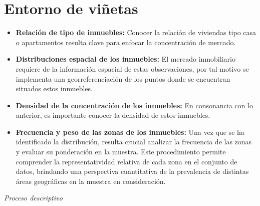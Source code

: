 \documentclass[12pt]{article}
\begin{document}
\section{Entorno de viñetas}


\begin{itemize} %
    \item \textbf{Relación de tipo de inmuebles:} Conocer la relación de viviendas tipo casa o apartamentos resulta clave para enfocar la concentración de mercado.
    \item \textbf{Distribuciones espacial de los inmuebles:} El mercado inmobiliario requiere de la información espacial de estas observaciones, por tal motivo se implementa una georreferenciación de los puntos donde se encuentran situados estos inmuebles.
    \item \textbf{Densidad de la concentración de los inmuebles:} En consonancia con lo anterior, es importante conocer la densidad de estos inmuebles.
    \item \textbf{Frecuencia y peso de las zonas de los inmuebles:} Una vez que se ha identificado la distribución, resulta crucial analizar la frecuencia de las zonas y evaluar su ponderación en la muestra. Este procedimiento permite comprender la representatividad relativa de cada zona en el conjunto de datos, brindando una perspectiva cuantitativa de la prevalencia de distintas áreas geográficas en la muestra en consideración.
\end{itemize}

\textit{Proceso descriptivo} %
\end{document}
